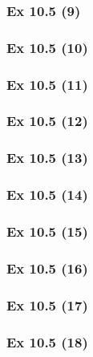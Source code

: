 \subsubsection{Ex 10.5 (9)}\label{sec:Ex_10.5.9}

\subsubsection{Ex 10.5 (10)}\label{sec:Ex_10.5.10}

\newpage		%

\subsubsection{Ex 10.5 (11)}\label{sec:Ex_10.5.11}

\subsubsection{Ex 10.5 (12)}\label{sec:Ex_10.5.12}

\subsubsection{Ex 10.5 (13)}\label{sec:Ex_10.5.13}

\subsubsection{Ex 10.5 (14)}\label{sec:Ex_10.5.14}

\subsubsection{Ex 10.5 (15)}\label{sec:Ex_10.5.15}

\subsubsection{Ex 10.5 (16)}\label{sec:Ex_10.5.16}

\subsubsection{Ex 10.5 (17)}\label{sec:Ex_10.5.17}

\subsubsection{Ex 10.5 (18)}\label{sec:Ex_10.5.18}


